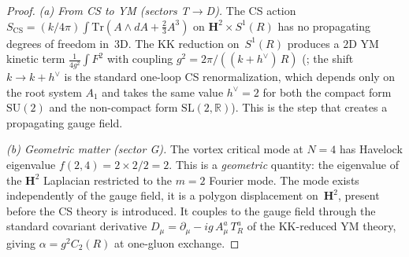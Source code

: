 \begin{proof}
\emph{(a) From CS to YM (sectors T$\to$D).}
The CS action
$S_{\mathrm{CS}} = (k/4\pi)\int \mathrm{Tr}(A \wedge dA + \tfrac{2}{3}A^3)$
on $\mathbf{H}^2 \times S^1(R)$ has no propagating degrees of freedom
in~$3$D.  The KK reduction on~$S^1(R)$ produces a $2$D YM kinetic term
$\tfrac{1}{4g^2}\int F^2$ with coupling
$g^2 = 2\pi/((k{+}h^\vee)\,R)$ (\citealt{BlauThompson1993};
the shift $k \to k{+}h^\vee$ is the standard one-loop CS
renormalization, which depends only on the root system $A_1$
and takes the same value $h^\vee = 2$ for both the compact
form $\mathrm{SU}(2)$ and the non-compact form
$\mathrm{SL}(2,\mathbb{R})$).
This is the step that creates a propagating gauge field.

\emph{(b) Geometric matter (sector G).}
The vortex critical mode at $N = 4$ has Havelock eigenvalue
$f(2,4) = 2 \times 2 / 2 = 2$.
This is a \emph{geometric} quantity: the eigenvalue of the
$\mathbf{H}^2$ Laplacian restricted to the $m = 2$ Fourier mode.
The mode exists independently of the gauge field, it is a polygon displacement on~$\mathbf{H}^2$,
present before the CS theory is introduced.
It couples to the gauge field through the standard
covariant derivative $D_\mu = \partial_\mu - ig\,A^a_\mu\,T^a_R$
of the KK-reduced YM theory, giving
$\alpha = g^2 C_2(R)$ at one-gluon exchange.


\end{proof}
